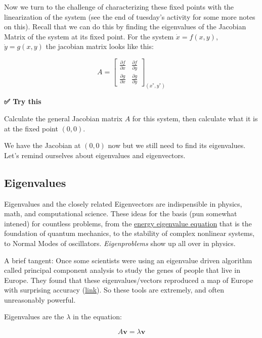 Now we turn to the challenge of characterizing these fixed points with
the linearization of the system (see the end of tuesday's activity for
some more notes on this). Recall that we can do this by finding the
eigenvalues of the Jacobian Matrix of the system at its fixed point. For
the system \(\dot{x} = f(x,y)\), \(\dot{y} = g(x,y)\) the jacobian
matrix looks like this:

\[
A = \begin{bmatrix} \frac{\partial f}{\partial x} & \frac{\partial f}{\partial y} \\ \frac{\partial g}{\partial x} & \frac{\partial g}{\partial y}\end{bmatrix}_{(x^*,y^*)}
\]

\textbf{✅ Try this}

Calculate the general Jacobian matrix \(A\) for this system, then
calculate what it is at the fixed point \((0,0)\).

We have the Jacobian at \((0,0)\) now but we still need to find its
eigenvalues. Let's remind ourselves about eigenvalues and eigenvectors.

\subsection{Eigenvalues}\label{eigenvalues}

Eigenvalues and the closely related Eigenvectors are indispensible in
physics, math, and computational science. These ideas for the basis (pun
somewhat intened) for countless problems, from the
\href{https://phys.libretexts.org/Bookshelves/Nuclear_and_Particle_Physics/Introduction_to_Applied_Nuclear_Physics_(Cappellaro)/02\%3A_Introduction_to_Quantum_Mechanics/2.04\%3A_Energy_Eigenvalue_Problem}{energy
eigenvalue equation} that is the foundation of quantum mechanics, to the
stability of complex nonlinear systems, to Normal Modes of oscillators.
\emph{Eigenproblems} show up all over in physics.

A brief tangent: Once some scientists were using an eigenvalue driven
algorithm called principal component analysis to study the genes of
people that live in Europe. They found that these eigenvalues/vectors
reproduced a map of Europe with surprising accuracy
(\href{https://www.ncbi.nlm.nih.gov/pmc/articles/PMC2735096/}{link}). So
these tools are extremely, and often unreasonably powerful.

Eigenvalues are the \(\lambda\) in the equation:

\[
A\mathbf{v} = \lambda \mathbf{v}
\]

